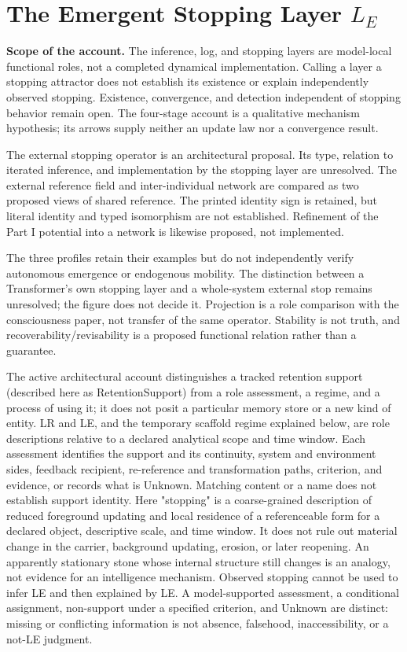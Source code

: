 \section{The Emergent Stopping Layer $L_E$}

\noindent\textbf{Scope of the account.} The inference, log, and stopping layers are model-local functional roles, not a completed dynamical implementation. Calling a layer a stopping attractor does not establish its existence or explain independently observed stopping. Existence, convergence, and detection independent of stopping behavior remain open. The four-stage account is a qualitative mechanism hypothesis; its arrows supply neither an update law nor a convergence result.

The external stopping operator is an architectural proposal. Its type, relation to iterated inference, and implementation by the stopping layer are unresolved. The external reference field and inter-individual network are compared as two proposed views of shared reference. The printed identity sign is retained, but literal identity and typed isomorphism are not established. Refinement of the Part I potential into a network is likewise proposed, not implemented.

The three profiles retain their examples but do not independently verify autonomous emergence or endogenous mobility. The distinction between a Transformer's own stopping layer and a whole-system external stop remains unresolved; the figure does not decide it. Projection is a role comparison with the consciousness paper, not transfer of the same operator. Stability is not truth, and recoverability/revisability is a proposed functional relation rather than a guarantee.

The active architectural account distinguishes a tracked retention support (described here as RetentionSupport) from a role assessment, a regime, and a process of using it; it does not posit a particular memory store or a new kind of entity. LR and LE, and the temporary scaffold regime explained below, are role descriptions relative to a declared analytical scope and time window. Each assessment identifies the support and its continuity, system and environment sides, feedback recipient, re-reference and transformation paths, criterion, and evidence, or records what is Unknown. Matching content or a name does not establish support identity. Here "stopping" is a coarse-grained description of reduced foreground updating and local residence of a referenceable form for a declared object, descriptive scale, and time window. It does not rule out material change in the carrier, background updating, erosion, or later reopening. An apparently stationary stone whose internal structure still changes is an analogy, not evidence for an intelligence mechanism. Observed stopping cannot be used to infer LE and then explained by LE. A model-supported assessment, a conditional assignment, non-support under a specified criterion, and Unknown are distinct: missing or conflicting information is not absence, falsehood, inaccessibility, or a not-LE judgment.

